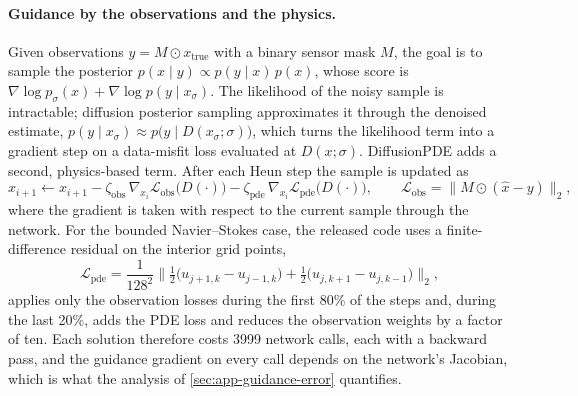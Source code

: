 \paragraph{Guidance by the observations and the physics.} Given observations $y = M\odot x_{\mathrm{true}}$ with a binary sensor mask $M$, the goal is to sample the posterior $p(x\mid y)\propto p(y\mid x)\,p(x)$, whose score is $\nabla\log p_\sigma(x) + \nabla\log p(y\mid x_\sigma)$. The likelihood of the noisy sample is intractable; diffusion posterior sampling \citep{chung2023dps} approximates it through the denoised estimate, $p(y\mid x_\sigma)\approx p\big(y\mid D(x_\sigma;\sigma)\big)$, which turns the likelihood term into a gradient step on a data-misfit loss evaluated at $D(x;\sigma)$. DiffusionPDE adds a second, physics-based term. After each Heun step the sample is updated as
\begin{equation}\label{eq:app-dps}
  x_{i+1} \leftarrow x_{i+1} - \zeta_{\mathrm{obs}}\,\nabla_{x_i}\mathcal L_{\mathrm{obs}}\big(D(\cdot)\big) - \zeta_{\mathrm{pde}}\,\nabla_{x_i}\mathcal L_{\mathrm{pde}}\big(D(\cdot)\big),
  \qquad \mathcal L_{\mathrm{obs}} = \big\|M\odot(\hat x - y)\big\|_2,
\end{equation}
where the gradient is taken with respect to the current sample through the network. For the bounded Navier--Stokes case, the released code uses a finite-difference residual on the interior grid points,
\begin{equation}
  \mathcal L_{\mathrm{pde}} = \frac{1}{128^2}\Big\|\tfrac12\big(u_{j+1,k}-u_{j-1,k}\big)+\tfrac12\big(u_{j,k+1}-u_{j,k-1}\big)\Big\|_2 ,
\end{equation}
applies only the observation losses during the first 80\% of the steps and, during the last 20\%, adds the PDE loss and reduces the observation weights by a factor of ten. Each solution therefore costs 3999 network calls, each with a backward pass, and the guidance gradient on every call depends on the network's Jacobian, which is what the analysis of \cref{sec:app-guidance-error} quantifies.

